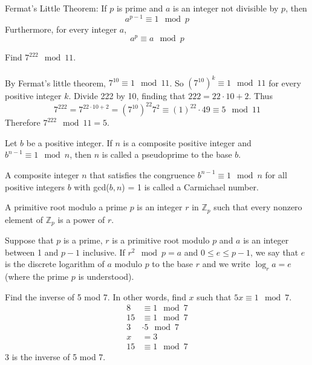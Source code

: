 \documentclass[12pt]{article}
\begin{document}
\begin{theorem} Fermat's Little Theorem: If $p$ is prime and $a$ is an integer not divisible by $p$, then $$a^{p - 1} \equiv 1 \mod p$$ Furthermore, for every integer $a$, $$a^p \equiv a \mod p $$ \end{theorem} 
\begin{example} Find $7^{222} \mod 11$. \\~\\
By Fermat's little theorem, $7^{10} \equiv 1 \mod 11$. So $(7^{10})^k \equiv 1 \mod 11$ for every positive integer $k$. Divide 222 by 10, finding that $222 = 22 \cdot 10 + 2$. Thus $$7^{222} = 7^{22 \cdot 10 + 2} = (7^{10})^{22}7^2 \equiv (1)^{22} \cdot 49 \equiv 5 \mod 11 $$ Therefore $7^{222} \mod 11 = 5$. \end{example} 
\begin{definition} Let $b$ be a positive integer. If $n$ is a composite positive integer and $b^{n - 1} \equiv 1 \mod n$, then $n$ is called a pseudoprime to the base $b$. \end{definition} 
\begin{definition} A composite integer $n$ that satisfies the congruence $b^{n - 1} \equiv 1 \mod n$ for all positive integers $b$ with gcd($b, n$) = 1 is called a Carmichael number. \end{definition} 
\begin{definition} A primitive root modulo a prime $p$ is an integer $r$ in $\mathbb{Z}_p$ such that every nonzero element of $\mathbb{Z}_p$ is a power of $r$. \end{definition} 
\begin{definition} Suppose that $p$ is a prime, $r$ is a primitive root modulo $p$ and $a$ is an integer between 1 and $p - 1$ inclusive. If $r^2 \mod p = a$ and $0 \leq e \leq p - 1$, we say that $e$ is the discrete logarithm of $a$ modulo $p$ to the base $r$ and we write $\log_r a = e$ (where the prime $p$ is understood). \end{definition} 


\begin{example} Find the inverse of 5 mod 7. In other words, find $x$ such that $5x \equiv 1 \mod 7$. 
$$\begin{aligned} 
8 &\equiv 1 \mod 7 \\
15 &\equiv 1 \mod 7 \\
3 &\cdot 5 \mod 7 \\
x &= 3 \\
15 &\equiv 1 \mod 7 
\end{aligned} $$ 
3 is the inverse of 5 mod 7. \end{example} 
\end{document}
